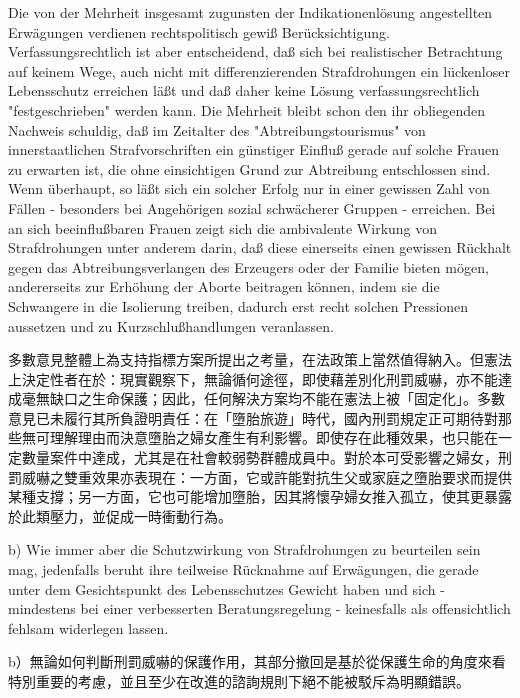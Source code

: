 \documentclass[12pt]{article}
\begin{document}
\syncleft
\begin{sourcepara}
Die von der Mehrheit insgesamt zugunsten der Indikationenlösung angestellten Erwägungen verdienen rechtspolitisch gewiß Berücksichtigung. Verfassungsrechtlich ist aber entscheidend, daß sich bei realistischer Betrachtung auf keinem Wege, auch nicht mit differenzierenden Strafdrohungen ein lückenloser Lebensschutz erreichen läßt und daß daher keine Lösung verfassungsrechtlich "festgeschrieben" werden kann. Die Mehrheit bleibt schon den ihr obliegenden Nachweis schuldig, daß im Zeitalter des "Abtreibungstourismus" von innerstaatlichen Strafvorschriften ein günstiger Einfluß gerade auf solche Frauen zu erwarten ist, die ohne einsichtigen Grund zur Abtreibung entschlossen sind. Wenn überhaupt, so läßt sich ein solcher Erfolg nur in einer gewissen Zahl von Fällen - besonders bei Angehörigen sozial schwächerer Gruppen - erreichen. Bei an sich beeinflußbaren Frauen zeigt sich die ambivalente Wirkung von Strafdrohungen unter anderem darin, daß diese einerseits einen gewissen Rückhalt gegen das Abtreibungsverlangen des Erzeugers oder der Familie bieten mögen, andererseits zur Erhöhung der Aborte beitragen können, indem sie die Schwangere in die Isolierung treiben, dadurch erst recht solchen Pressionen aussetzen und zu Kurzschlußhandlungen veranlassen.
\end{sourcepara}
\begin{transpara}
多數意見整體上為支持指標方案所提出之考量，在法政策上當然值得納入。但憲法上決定性者在於：現實觀察下，無論循何途徑，即使藉差別化刑罰威嚇，亦不能達成毫無缺口之生命保護；因此，任何解決方案均不能在憲法上被「固定化」。多數意見已未履行其所負證明責任：在「墮胎旅遊」時代，國內刑罰規定正可期待對那些無可理解理由而決意墮胎之婦女產生有利影響。即使存在此種效果，也只能在一定數量案件中達成，尤其是在社會較弱勢群體成員中。對於本可受影響之婦女，刑罰威嚇之雙重效果亦表現在：一方面，它或許能對抗生父或家庭之墮胎要求而提供某種支撐；另一方面，它也可能增加墮胎，因其將懷孕婦女推入孤立，使其更暴露於此類壓力，並促成一時衝動行為。
\end{transpara}

\syncleft
\begin{sourcepara}
b) Wie immer aber die Schutzwirkung von Strafdrohungen zu beurteilen sein mag, jedenfalls beruht ihre teilweise Rücknahme auf Erwägungen, die gerade unter dem Gesichtspunkt des Lebensschutzes Gewicht haben und sich - mindestens bei einer verbesserten Beratungsregelung - keinesfalls als offensichtlich fehlsam widerlegen lassen.
\end{sourcepara}
\begin{transpara}
b）無論如何判斷刑罰威嚇的保護作用，其部分撤回是基於從保護生命的角度來看特別重要的考慮，並且至少在改進的諮詢規則下絕不能被駁斥為明顯錯誤。
\end{transpara}
\end{document}
